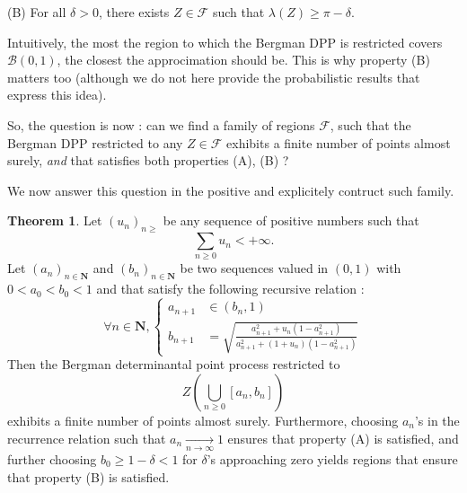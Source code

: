 \documentclass[11pt]{article}
\theoremstyle{plain}
\theoremstyle{definition}
\newtheorem{theorem}[definition]{Theorem}
\begin{document}
(B) For all $ \delta > 0 $, there exists $ Z \in \mathcal F $ such that $ \lambda (Z) \geqslant \pi - \delta $.

Intuitively, the most the region to which the Bergman DPP is restricted covers $ \mathcal B(0,1) $, the closest the approcimation should be. This is why property (B) matters too (although we do not here provide the probabilistic results that express this idea). 

So, the question is now : can we find a family of regions $ \mathcal F $, such that the Bergman DPP restricted to any $ Z \in \mathcal F $ exhibits a finite number of points almost surely, \textit{and} that satisfies both properties (A), (B) ?

We now answer this question in the positive and explicitely contruct such family.

\begin{theorem}
Let $ (u_n)_{n\geqslant} $ be any sequence of positive numbers such that 
\[ 
    \sum_{n \ge 0} u_n < + \infty. 
\] 
Let $ (a_n)_{n \in \mathbf N} $ and $ (b_n)_{n \in \mathbf N} $ be two sequences valued in $ (0,1) $ with $ 0 < a_0 < b_0 < 1 $ and that satisfy the following recursive relation :
\[
\forall n \in \mathbf N, 
\left\{
\begin{aligned}
    a_{n+1} &\in (b_n, 1) \\
    b_{n+1} &= \sqrt{ \frac{a_{n+1}^2 + u_n(1-a_{n+1}^2)}{a_{n+1}^2 + (1+u_n)(1-a_{n+1}^2)} }
\end{aligned}
\right.
\]
Then the Bergman determinantal point process restricted to 
\[
    Z\left( \bigcup_{n \ge 0} [a_n, b_n]\right) 
\]
exhibits a finite number of points almost surely. Furthermore, choosing $ a_n $'s in the recurrence relation such that $ a_n \xrightarrow[n \to \infty ]{} 1 $ ensures that property (A) is satisfied, and further choosing $ b_0 \geqslant 1 - \delta < 1$ for $ \delta $'s approaching zero yields regions that ensure that property (B) is satisfied. 
\end{theorem}
\end{document}
